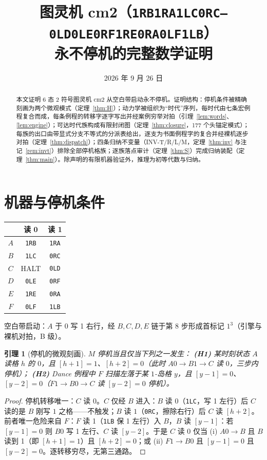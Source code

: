 \documentclass[11pt]{ctexart}
\title{\bfseries 图灵机 cm2（\texttt{1RB1RA1LC0RC---0LD0LE0RF1RE0RA0LF1LB}）\\ \large 永不停机的完整数学证明}
\author{}
\date{2026 年 9 月 26 日}
\newtheorem{lemma}[theorem]{引理}
\theoremstyle{definition}
\newcommand{\HALT}{\textsf{HALT}}
\begin{document}
\maketitle

\begin{abstract}
本文证明 6 态 2 符号图灵机 cm2 从空白带启动永不停机。证明结构：停机条件被精确刻画为两个微观模式（定理~\ref{thm:H}）；动力学被组织为``时代''序列，每时代由七条宏例程复合而成，每条例程的转移字逐字写出并经案例穷举对拍（引理~\ref{lem:words}、\ref{lem:engine}）；可达时代族构成有限封闭图（定理~\ref{thm:closure}，177 个头锚定模式）；每族的出口由带显式分支不等式的分派表给出，逐支为书面例程字的复合并经裸机逐步对拍（定理~\ref{thm:dispatch}）；四条归纳不变量（INV-T/R/L/M，定理~\ref{thm:inv} 与注记~\ref{rem:invt}）排除全部停机格族；逐族落点审计（定理~\ref{thm:S}）完成归纳装配（定理~\ref{thm:main}）。除声明的有限机器验证外，推理为初等代数与归纳。
\end{abstract}

\section{机器与停机条件}

\begin{table}[h]\centering
\begin{tabular}{c|cc} & 读 0 & 读 1\\\toprule
$A$ & \texttt{1RB} & \texttt{1RA}\\
$B$ & \texttt{1LC} & \texttt{0RC}\\
$C$ & \HALT & \texttt{0LD}\\
$D$ & \texttt{0LE} & \texttt{0RF}\\
$E$ & \texttt{1RE} & \texttt{0RA}\\
$F$ & \texttt{0LF} & \texttt{1LB}\\
\end{tabular}\end{table}

空白带启动：$A$ 于 0 写 1 右行，经 $B,C,D,E$ 链于第 8 步形成首标记 $1^3$（引擎与裸机对拍，B 级）。

\begin{lemma}[停机的微观刻画]\label{thm:H}
$M$ 停机当且仅当下列之一发生：
\textbf{(H1)} 某时刻状态 $A$ 读格 $h$ 的 $0$，且 $[h{+}1]=1$、$[h{+}2]=0$（此时 $A0{\to}B1{\to}C$ 读 $0$，三步内停机）；
\textbf{(H2)} Dance 例程中 $F$ 扫描左落于某 $1$-岛格 $y$，且 $[y{-}1]=0$、$[y{-}2]=0$（$F1{\to}B0{\to}C$ 读 $[y{-}2]=0$ 停机）。
\end{lemma}
\begin{proof}
停机转移唯一：$C$ 读 $0$。$C$ 仅经 $B$ 进入：$B$ 读 $0$（\texttt{1LC}，写 1 左行）后 $C$ 读的是 $B$ 刚写 $1$ 之格——不触发；$B$ 读 $1$（\texttt{0RC}，擦除右行）后 $C$ 读 $[h{+}2]$。前者唯一危险来自 $F$：$F$ 读 1（\texttt{1LB} 保 1 左行）入 $B$，$B$ 读 $[y{-}1]$：若 $[y{-}1]=0$ 则 $B0$ 写 1 左行、$C$ 读 $[y{-}2]$。于是 $C$ 读 0 仅当 (i) $A0{\to}B$ 且 $B$ 读到 1（即 $[h{+}1]=1$）且 $[h{+}2]=0$；或 (ii) $F1{\to}B0$ 且 $[y{-}1]=0$ 且 $[y{-}2]=0$。逐转移穷尽，无第三通路。
\end{proof}
\end{document}
